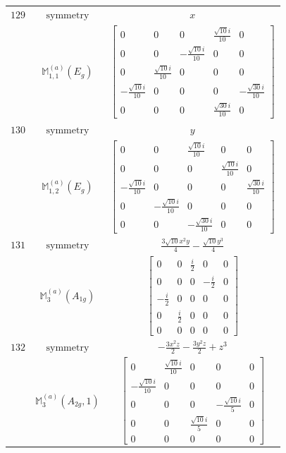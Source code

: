 \documentclass[fleqn,8pt,landscape]{jsarticle}
\begin{document}
\begin{longtable}{ccc}
$ 129 $ & $ \text{symmetry} $ & $ x $ \\
$  $ & $ \mathbb{M}_{1,1}^{(a)}(E_{g}) $ & $ \begin{bmatrix} 0 & 0 & 0 & \frac{\sqrt{10} i}{10} & 0 \\ 0 & 0 & - \frac{\sqrt{10} i}{10} & 0 & 0 \\ 0 & \frac{\sqrt{10} i}{10} & 0 & 0 & 0 \\ - \frac{\sqrt{10} i}{10} & 0 & 0 & 0 & - \frac{\sqrt{30} i}{10} \\ 0 & 0 & 0 & \frac{\sqrt{30} i}{10} & 0 \end{bmatrix} $ \\ \hline
$ 130 $ & $ \text{symmetry} $ & $ y $ \\
$  $ & $ \mathbb{M}_{1,2}^{(a)}(E_{g}) $ & $ \begin{bmatrix} 0 & 0 & \frac{\sqrt{10} i}{10} & 0 & 0 \\ 0 & 0 & 0 & \frac{\sqrt{10} i}{10} & 0 \\ - \frac{\sqrt{10} i}{10} & 0 & 0 & 0 & \frac{\sqrt{30} i}{10} \\ 0 & - \frac{\sqrt{10} i}{10} & 0 & 0 & 0 \\ 0 & 0 & - \frac{\sqrt{30} i}{10} & 0 & 0 \end{bmatrix} $ \\ \hline
$ 131 $ & $ \text{symmetry} $ & $ \frac{3 \sqrt{10} x^{2} y}{4} - \frac{\sqrt{10} y^{3}}{4} $ \\
$  $ & $ \mathbb{M}_{3}^{(a)}(A_{1g}) $ & $ \begin{bmatrix} 0 & 0 & \frac{i}{2} & 0 & 0 \\ 0 & 0 & 0 & - \frac{i}{2} & 0 \\ - \frac{i}{2} & 0 & 0 & 0 & 0 \\ 0 & \frac{i}{2} & 0 & 0 & 0 \\ 0 & 0 & 0 & 0 & 0 \end{bmatrix} $ \\ \hline
$ 132 $ & $ \text{symmetry} $ & $ - \frac{3 x^{2} z}{2} - \frac{3 y^{2} z}{2} + z^{3} $ \\
$  $ & $ \mathbb{M}_{3}^{(a)}(A_{2g},1) $ & $ \begin{bmatrix} 0 & \frac{\sqrt{10} i}{10} & 0 & 0 & 0 \\ - \frac{\sqrt{10} i}{10} & 0 & 0 & 0 & 0 \\ 0 & 0 & 0 & - \frac{\sqrt{10} i}{5} & 0 \\ 0 & 0 & \frac{\sqrt{10} i}{5} & 0 & 0 \\ 0 & 0 & 0 & 0 & 0 \end{bmatrix} $ \\ \hline

\end{longtable}
\end{document}
